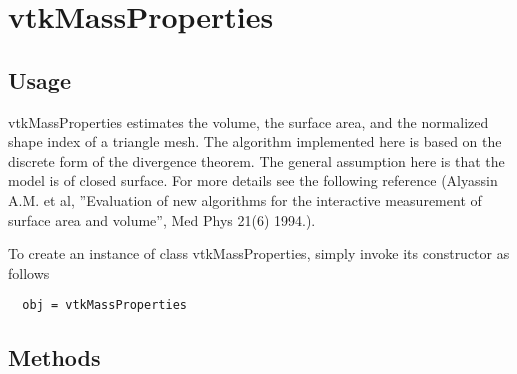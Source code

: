 \section{vtkMassProperties}

\subsection{Usage}

 vtkMassProperties estimates the volume, the surface area, and the
 normalized shape index of a triangle mesh.  The algorithm
 implemented here is based on the discrete form of the divergence
 theorem.  The general assumption here is that the model is of
 closed surface.  For more details see the following reference
 (Alyassin A.M. et al, ''Evaluation of new algorithms for the
 interactive measurement of surface area and volume'', Med Phys 21(6)
 1994.).

To create an instance of class vtkMassProperties, simply
invoke its constructor as follows
\begin{verbatim}
  obj = vtkMassProperties
\end{verbatim}
\subsection{Methods}

